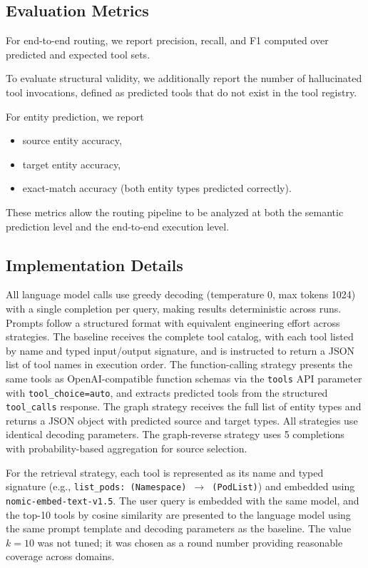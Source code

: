 \subsection{Evaluation Metrics}
\label{sec:metrics}

For end-to-end routing, we report precision, recall, and F1 computed over predicted and expected tool sets.

To evaluate structural validity, we additionally report the number of hallucinated tool invocations, defined as predicted tools that do not exist in the tool registry.

For entity prediction, we report

\begin{itemize}
    \item source entity accuracy,
    \item target entity accuracy,
    \item exact-match accuracy (both entity types predicted correctly).
\end{itemize}

These metrics allow the routing pipeline to be analyzed at both the semantic prediction level and the end-to-end execution level.

\subsection{Implementation Details}
\label{sec:implementation}

All language model calls use greedy decoding (temperature 0, max tokens 1024) with a single completion per query, making results deterministic across runs.
Prompts follow a structured format with equivalent engineering effort across strategies.
The baseline receives the complete tool catalog, with each tool listed by name and typed input/output signature, and is instructed to return a JSON list of tool names in execution order.
The function-calling strategy presents the same tools as OpenAI-compatible function schemas via the \texttt{tools} API parameter with \texttt{tool\_choice=auto}, and extracts predicted tools from the structured \texttt{tool\_calls} response.
The graph strategy receives the full list of entity types and returns a JSON object with predicted source and target types.
All strategies use identical decoding parameters.
The graph-reverse strategy uses 5 completions with probability-based aggregation for source selection.

For the retrieval strategy, each tool is represented as its name and typed signature (e.g., \texttt{list\_pods: (Namespace) $\rightarrow$ (PodList)}) and embedded using \texttt{nomic-embed-text-v1.5}.
The user query is embedded with the same model, and the top-10 tools by cosine similarity are presented to the language model using the same prompt template and decoding parameters as the baseline.
The value $k = 10$ was not tuned; it was chosen as a round number providing reasonable coverage across domains.

